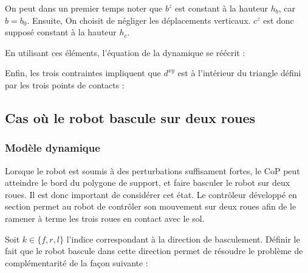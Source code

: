 				On peut dans un premier temps noter que $b^z$ est constant à la hauteur $h_b$, car $b=b_0$. Ensuite, On choisit de négliger les déplacements verticaux. $c^z$ est donc supposé constant à la hauteur $h_c$.
				
				En utilisant ces éléments, l'équation de la dynamique  se réécrit :
				
				
				Enfin, les trois contraintes  impliquent que $d^{xy}$ est à l'intérieur du triangle défini par les trois points de contacts :
				

			
			
		\subsection{Cas où le robot bascule sur deux roues}
			\subsubsection{Modèle dynamique}
			
				Lorsque le robot est soumis à des perturbations suffisament fortes, le CoP peut atteindre le bord du polygone de support, et faire basculer le robot sur deux roues.
				Il est donc important de considérer cet état. 
				Le contrôleur développé en section  permet au robot de contrôler son mouvement sur deux roues afin de le ramener à terme les trois roues en contact avec le sol.
				
				Soit $k\in\{f,r,l\}$ l'indice correspondant à la direction de basculement. 
				Définir le fait que le robot bascule dans cette direction  permet de résoudre le problème de complémentarité de la façon suivante :
				

